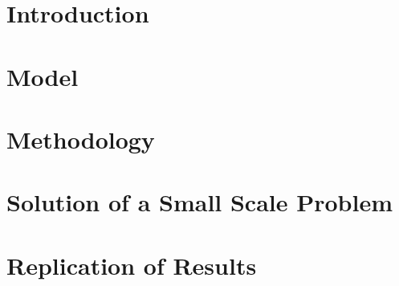 \documentclass[12pt]{report}
\begin{document}
    
    
    \chapter{Introduction}
        \doublespacing
        
    
    \singlespacing
    \chapter{Model}
        \doublespacing
        
    
    \singlespacing
    \chapter{Methodology}
        \doublespacing
        
        
    \singlespacing
    \chapter{Solution of a Small Scale Problem}
        \doublespacing
        
        
    \singlespacing
    \chapter{Replication of Results}
        \doublespacing
        
        
    \newpage
    
    
    
\end{document}
